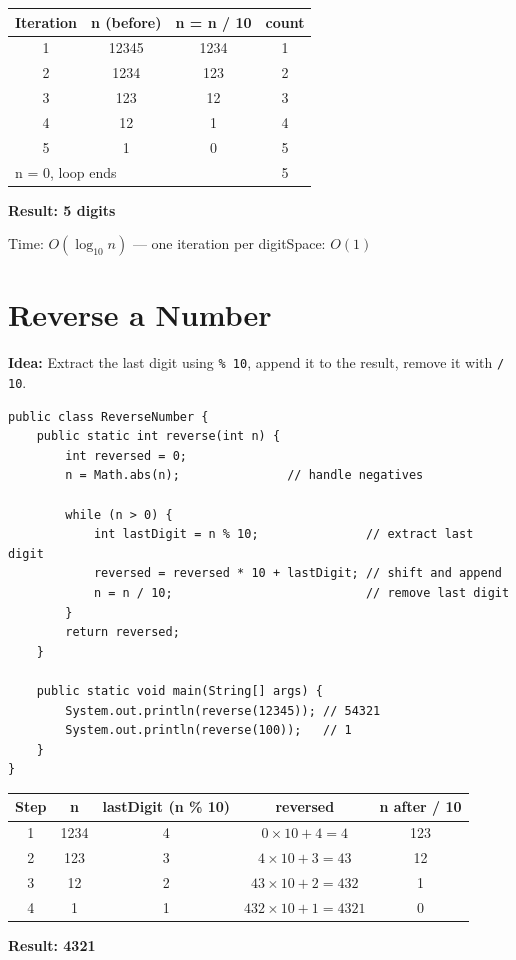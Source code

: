 \documentclass[12pt,a4paper,oneside]{book}
\begin{document}
\begin{dryrun}
\begin{center}
\begin{tabular}{cccc}
\toprule
\textbf{Iteration} & \textbf{n (before)} & \textbf{n = n / 10} & \textbf{count}\\
\midrule
1 & 12345 & 1234 & 1\\
2 & 1234  & 123  & 2\\
3 & 123   & 12   & 3\\
4 & 12    & 1    & 4\\
5 & 1     & 0    & 5\\
\multicolumn{3}{l}{n = 0, loop ends} & 5\\
\bottomrule
\end{tabular}
\end{center}
\textbf{Result: 5 digits}
\end{dryrun}

\begin{complexity}
Time: $O(\log_{10} n)$ --- one iteration per digit\quad Space: $O(1)$
\end{complexity}

\section{Reverse a Number}

\textbf{Idea:} Extract the last digit using \texttt{\% 10}, append it to the result, remove it with \texttt{/ 10}.

\begin{lstlisting}[caption={Reverse a Number}]
public class ReverseNumber {
    public static int reverse(int n) {
        int reversed = 0;
        n = Math.abs(n);               // handle negatives

        while (n > 0) {
            int lastDigit = n % 10;               // extract last digit
            reversed = reversed * 10 + lastDigit; // shift and append
            n = n / 10;                           // remove last digit
        }
        return reversed;
    }

    public static void main(String[] args) {
        System.out.println(reverse(12345)); // 54321
        System.out.println(reverse(100));   // 1
    }
}
\end{lstlisting}

\begin{dryrun}
\begin{center}
\begin{tabular}{ccccc}
\toprule
\textbf{Step} & \textbf{n} & \textbf{lastDigit (n \% 10)} & \textbf{reversed} & \textbf{n after / 10}\\
\midrule
1 & 1234 & 4 & $0 \times 10 + 4 = 4$    & 123\\
2 & 123  & 3 & $4 \times 10 + 3 = 43$   & 12\\
3 & 12   & 2 & $43 \times 10 + 2 = 432$ & 1\\
4 & 1    & 1 & $432 \times 10 + 1 = 4321$ & 0\\
\bottomrule
\end{tabular}
\end{center}
\textbf{Result: 4321}
\end{dryrun}
\end{document}
